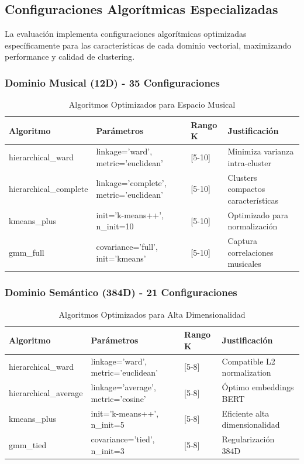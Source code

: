 \documentclass[12pt,a4paper]{report}
\begin{document}
\subsection{Configuraciones Algorítmicas Especializadas}

La evaluación implementa configuraciones algorítmicas optimizadas específicamente para las características de cada dominio vectorial, maximizando performance y calidad de clustering.

\subsubsection{Dominio Musical (12D) - 35 Configuraciones}

\begin{table}[H]
\centering
\caption{Algoritmos Optimizados para Espacio Musical}
\begin{tabular}{|l|l|l|l|}
\hline
\textbf{Algoritmo} & \textbf{Parámetros} & \textbf{Rango K} & \textbf{Justificación} \\
\hline
hierarchical\_ward & linkage='ward', metric='euclidean' & [5-10] & Minimiza varianza intra-cluster \\
\hline
hierarchical\_complete & linkage='complete', metric='euclidean' & [5-10] & Clusters compactos características \\
\hline
kmeans\_plus & init='k-means++', n\_init=10 & [5-10] & Optimizado para normalización \\
\hline
gmm\_full & covariance='full', init='kmeans' & [5-10] & Captura correlaciones musicales \\
\hline
\end{tabular}
\end{table}

\subsubsection{Dominio Semántico (384D) - 21 Configuraciones}

\begin{table}[H]
\centering
\caption{Algoritmos Optimizados para Alta Dimensionalidad}
\begin{tabular}{|l|l|l|l|}
\hline
\textbf{Algoritmo} & \textbf{Parámetros} & \textbf{Rango K} & \textbf{Justificación} \\
\hline
hierarchical\_ward & linkage='ward', metric='euclidean' & [5-8] & Compatible L2 normalization \\
\hline
hierarchical\_average & linkage='average', metric='cosine' & [5-8] & Óptimo embeddings BERT \\
\hline
kmeans\_plus & init='k-means++', n\_init=5 & [5-8] & Eficiente alta dimensionalidad \\
\hline
gmm\_tied & covariance='tied', n\_init=3 & [5-8] & Regularización 384D \\
\hline
\end{tabular}
\end{table}
\end{document}
